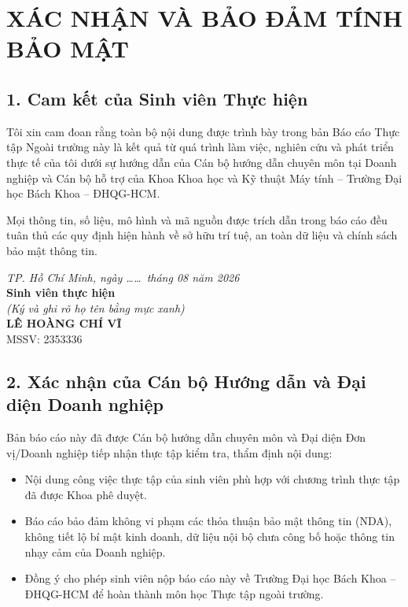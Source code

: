 \chapter*{XÁC NHẬN VÀ BẢO ĐẢM TÍNH BẢO MẬT}

\section*{1. Cam kết của Sinh viên Thực hiện}
Tôi xin cam đoan rằng toàn bộ nội dung được trình bày trong bản Báo cáo Thực tập Ngoài trường này là kết quả từ quá trình làm việc, nghiên cứu và phát triển thực tế của tôi dưới sự hướng dẫn của Cán bộ hướng dẫn chuyên môn tại Doanh nghiệp và Cán bộ hỗ trợ của Khoa Khoa học và Kỹ thuật Máy tính -- Trường Đại học Bách Khoa -- ĐHQG-HCM. 

Mọi thông tin, số liệu, mô hình và mã nguồn được trích dẫn trong báo cáo đều tuân thủ các quy định hiện hành về sở hữu trí tuệ, an toàn dữ liệu và chính sách bảo mật thông tin.

\vspace{0.8cm}
\begin{flushright}
\begin{minipage}{0.45\textwidth}
\centering
\textit{TP. Hồ Chí Minh, ngày \dots\dots\ tháng 08 năm 2026}\\[0.2cm]
\textbf{Sinh viên thực hiện}\\[0.1cm]
\textit{(Ký và ghi rõ họ tên bằng mực xanh)}\\[2.8cm]
\textbf{LÊ HOÀNG CHÍ VĨ}\\
MSSV: 2353336
\end{minipage}
\end{flushright}

\vspace{1.0cm}

\section*{2. Xác nhận của Cán bộ Hướng dẫn và Đại diện Doanh nghiệp}
Bản báo cáo này đã được Cán bộ hướng dẫn chuyên môn và Đại diện Đơn vị/Doanh nghiệp tiếp nhận thực tập kiểm tra, thẩm định nội dung:
\begin{itemize}[leftmargin=1.5cm, label=--]
  \item Nội dung công việc thực tập của sinh viên phù hợp với chương trình thực tập đã được Khoa phê duyệt.
  \item Báo cáo bảo đảm không vi phạm các thỏa thuận bảo mật thông tin (NDA), không tiết lộ bí mật kinh doanh, dữ liệu nội bộ chưa công bố hoặc thông tin nhạy cảm của Doanh nghiệp.
  \item Đồng ý cho phép sinh viên nộp báo cáo này về Trường Đại học Bách Khoa -- ĐHQG-HCM để hoàn thành môn học Thực tập ngoài trường.
\end{itemize}

